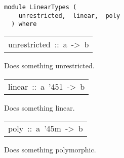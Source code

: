 \label{module:LinearTypes}
\haddockbeginheader
{\haddockverb\begin{verbatim}
module LinearTypes (
    unrestricted,  linear,  poly
  ) where\end{verbatim}}
\haddockendheader

\begin{haddockdesc}
\item[\begin{tabular}{@{}l}
unrestricted\ ::\ a\ ->\ b
\end{tabular}]\haddockbegindoc
Does something unrestricted.\par

\end{haddockdesc}
\begin{haddockdesc}
\item[\begin{tabular}{@{}l}
linear\ ::\ a\ {\char '45}1\ ->\ b
\end{tabular}]\haddockbegindoc
Does something linear.\par

\end{haddockdesc}
\begin{haddockdesc}
\item[\begin{tabular}{@{}l}
poly\ ::\ a\ {\char '45}m\ ->\ b
\end{tabular}]\haddockbegindoc
Does something polymorphic.\par

\end{haddockdesc}